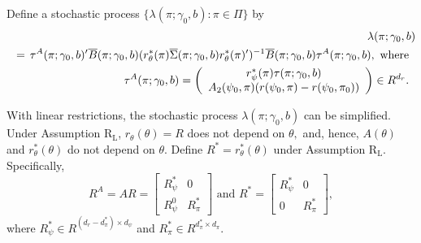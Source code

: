 \documentclass[12pt,thmsb,titlepage,final,oneside,letterpaper]{article}
\begin{document}
Define a stochastic process $\{\lambda (\pi ;\gamma _{0},b):\pi \in \Pi \}$
by%
\begin{eqnarray}
&&\hspace{-0.08in}\lambda (\pi ;\gamma _{0},b)\hspace{-0.08in}  \notag \\
&=&\hspace{-0.08in}\tau ^{A}(\pi ;\gamma _{0},b)^{\prime }\overline{B}(\pi
;\gamma _{0},b)(r_{\theta }^{\ast }(\pi )\overline{\Sigma }(\pi ;\gamma
_{0},b)r_{\theta }^{\ast }(\pi )^{\prime })^{-1}\overline{B}(\pi ;\gamma
_{0},b)\tau ^{A}(\pi ;\gamma _{0},b),\text{ where}  \notag \\
&&\hspace{-0.25in}\tau ^{A}(\pi ;\gamma _{0},b)\overset{}{=}\left( 
\begin{array}{c}
r_{\psi }^{\ast }(\pi )\tau (\pi ;\gamma _{0},b) \\ 
A_{2}(\psi _{0},\pi )(r(\psi _{0},\pi )-r(\psi _{0},\pi _{0}))%
\end{array}%
\right) \overset{}{\in }R^{d_{r}}.
\end{eqnarray}

With linear restrictions, the stochastic process $\lambda (\pi ;\gamma
_{0},b)$ can be simplified. Under Assumption R$_{\text{L}}$, $r_{\theta
}(\theta )=R$ does not depend on $\theta ,$ and, hence, $A(\theta )$ and $%
r_{\theta }^{\ast }(\theta )$ do not depend on $\theta .$ Define $R^{\ast
}=r_{\theta }^{\ast }(\theta )$ under Assumption R$_{\text{L}}$.
Specifically, 
\begin{equation}
R^{A}=AR=\left[ 
\begin{array}{cc}
R_{\psi }^{\ast } & 0 \\ 
R_{\psi }^{0} & R_{\pi }^{\ast }%
\end{array}%
\right] \text{ and }R^{\ast }=\left[ 
\begin{array}{cc}
R_{\psi }^{\ast } & 0 \\ 
0 & R_{\pi }^{\ast }%
\end{array}%
\right] ,
\end{equation}%
where $R_{\psi }^{\ast }\in R^{(d_{r}-d_{\pi }^{\ast })\times d_{\psi }}$
and $R_{\pi }^{\ast }\in R^{d_{\pi }^{\ast }\times d_{\pi }}.$
\end{document}
